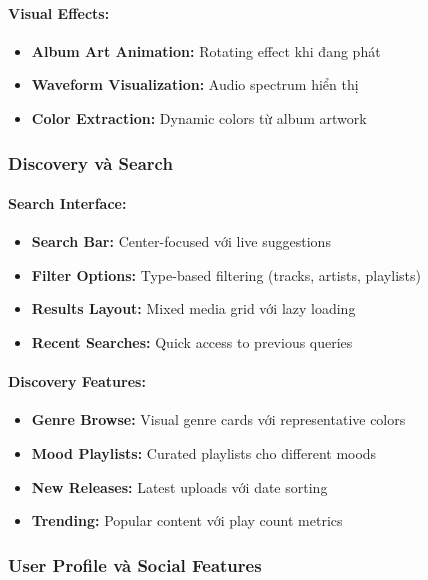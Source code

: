 \paragraph{Visual Effects:}
\begin{itemize}
    \item \textbf{Album Art Animation:} Rotating effect khi đang phát
    \item \textbf{Waveform Visualization:} Audio spectrum hiển thị
    \item \textbf{Color Extraction:} Dynamic colors từ album artwork
\end{itemize}

\subsubsection{Discovery và Search}

\paragraph{Search Interface:}
\begin{itemize}
    \item \textbf{Search Bar:} Center-focused với live suggestions
    \item \textbf{Filter Options:} Type-based filtering (tracks, artists, playlists)
    \item \textbf{Results Layout:} Mixed media grid với lazy loading
    \item \textbf{Recent Searches:} Quick access to previous queries
\end{itemize}

\paragraph{Discovery Features:}
\begin{itemize}
    \item \textbf{Genre Browse:} Visual genre cards với representative colors
    \item \textbf{Mood Playlists:} Curated playlists cho different moods
    \item \textbf{New Releases:} Latest uploads với date sorting
    \item \textbf{Trending:} Popular content với play count metrics
\end{itemize}

\subsubsection{User Profile và Social Features}

